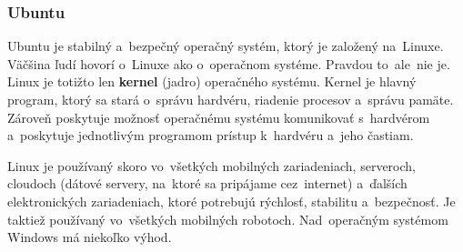 \subsubsection{Ubuntu}
\label{sec:ubuntu}

Ubuntu je stabilný a~bezpečný operačný systém, ktorý je založený na~Linuxe. Väčšina ľudí hovorí o~Linuxe ako o~operačnom systéme. Pravdou
to~ale~nie je. Linux je totižto len \textbf{kernel} (jadro) operačného systému. Kernel je hlavný program, ktorý sa stará o~správu hardvéru,
riadenie procesov a~správu pamäte. Zároveň poskytuje možnosť operačnému systému komunikovať s~hardvérom a~poskytuje jednotlivým programom
prístup k~hardvéru a~jeho častiam.

Linux je používaný skoro vo~všetkých mobilných zariadeniach, serveroch, cloudoch (dátové servery, na~ktoré sa pripájame cez~internet)
a~ďalších elektronických zariadeniach, ktoré potrebujú rýchlosť, stabilitu a~bezpečnosť. Je taktiež používaný vo~všetkých mobilných
robotoch. Nad~operačným systémom Windows má niekoľko výhod.

